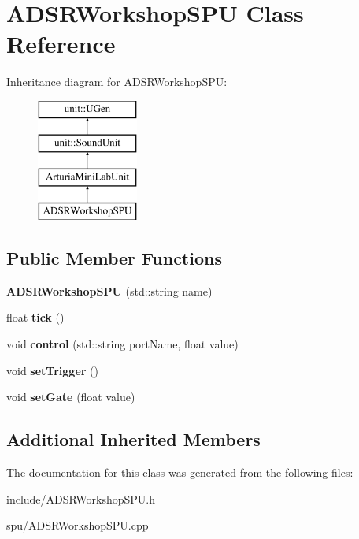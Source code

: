 \hypertarget{classADSRWorkshopSPU}{}\section{A\+D\+S\+R\+Workshop\+S\+PU Class Reference}
\label{classADSRWorkshopSPU}
Inheritance diagram for A\+D\+S\+R\+Workshop\+S\+PU\+:\begin{figure}[H]
\begin{center}
\leavevmode
\includegraphics[height=4.000000cm]{classADSRWorkshopSPU}
\end{center}
\end{figure}
\subsection*{Public Member Functions}
\begin{DoxyCompactItemize}
\item 
{\bfseries A\+D\+S\+R\+Workshop\+S\+PU} (std\+::string name)\hypertarget{classADSRWorkshopSPU_a2140f477c0bdc9fac9b66a6c103bb126}{}\label{classADSRWorkshopSPU_a2140f477c0bdc9fac9b66a6c103bb126}

\item 
float {\bfseries tick} ()\hypertarget{classADSRWorkshopSPU_a8ec50457bbb3455b797f87cdb9988164}{}\label{classADSRWorkshopSPU_a8ec50457bbb3455b797f87cdb9988164}

\item 
void {\bfseries control} (std\+::string port\+Name, float value)\hypertarget{classADSRWorkshopSPU_af50b5a155375a444b9ebfe154b643409}{}\label{classADSRWorkshopSPU_af50b5a155375a444b9ebfe154b643409}

\item 
void {\bfseries set\+Trigger} ()\hypertarget{classADSRWorkshopSPU_a961200f724c466c0dc0a0156dd01cbcc}{}\label{classADSRWorkshopSPU_a961200f724c466c0dc0a0156dd01cbcc}

\item 
void {\bfseries set\+Gate} (float value)\hypertarget{classADSRWorkshopSPU_a51be23dcf951c1e752c218bf3c0be9bd}{}\label{classADSRWorkshopSPU_a51be23dcf951c1e752c218bf3c0be9bd}

\end{DoxyCompactItemize}
\subsection*{Additional Inherited Members}


The documentation for this class was generated from the following files\+:\begin{DoxyCompactItemize}
\item 
include/A\+D\+S\+R\+Workshop\+S\+P\+U.\+h\item 
spu/A\+D\+S\+R\+Workshop\+S\+P\+U.\+cpp\end{DoxyCompactItemize}
